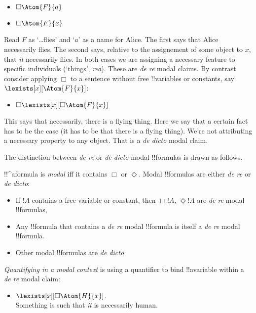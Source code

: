 \documentclass[../../../include/open-logic-section]{subfiles}
\begin{document}
\begin{itemize}
    \item $\Box\Atom{F}{a}$
    \item $\Box\Atom{F}{x}$
\end{itemize}

Read $F$ as `\dots flies' and `$a$' as a name for Alice. The first
says that Alice necessarily flies. The second says, relative to the
assignement of some object to $x$, that \emph{it} necessarily flies.
In both cases we are assigning a necessary feature to specific
individuals (`things', \emph{rea}). These are \emph{de re} modal
claims. By contrast consider applying $\Box$ to a sentence without 
free !!{variable}s or constants, say $\lexists[x][\Atom{F}{x}]$:

\begin{itemize}
    \item $\Box\lexists[x][\Box\Atom{F}{x}]$
\end{itemize}

This says that necessarily, there is a flying thing. Here we say that 
a certain fact has to be the case (it has to be that there is a flying
thing). We're not attributing a necessary property to any object. 
That is a \emph{de dicto} modal claim.

The distinction between \emph{de re} or \emph{de dicto} modal !!{formula}s
is drawn as follows.

\begin{defn}[De re vs de dicto]
!!^a{formula} is \emph{modal} iff it contains $\Box$ or 
$\Diamond$. Modal !!{formula}s are either \emph{de re} or \emph{de dicto}:
\begin{itemize}
\item If $!A$ contains a free variable or constant, then $\Box!A$, $\Diamond!A$
are \emph{de re} modal !!{formula}s,
\item Any !!{formula} that contains a \emph{de re} modal !!{formula} is
itself a \emph{de re} modal !!{formula}.
\item Other modal !!{formula}s are \emph{de dicto}
\end{itemize}

\end{defn}

\emph{Quantifying in a modal context} is using a quantifier to bind
!!a{variable} within a \emph{de re} modal claim: 

\begin{itemize}
\item $\lexists[x][\Box\Atom{H}{x}]$.\\
Something is such that \emph{it} is necessarily human.
\end{itemize}
\end{document}

